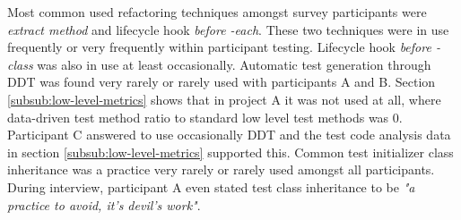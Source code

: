 Most common used refactoring techniques amongst survey participants were \textit{extract method} and lifecycle hook \textit{before -each}.
These two techniques were in use frequently or very frequently within participant testing. Lifecycle hook \textit{before -class} was also
in use at least occasionally. Automatic test generation through DDT was found very rarely or rarely used with participants A
and B. Section \ref{subsub:low-level-metrics} shows that in project A it was not used at all, where data-driven test method ratio to standard
low level test methods was 0. Participant C answered to use occasionally DDT and the test code analysis
data in section \ref{subsub:low-level-metrics} supported this. Common test initializer class inheritance was a practice
very rarely or rarely used amongst all participants. During interview, participant A even stated test class inheritance
to be \textit{"a practice to avoid, it's devil's work"}.

